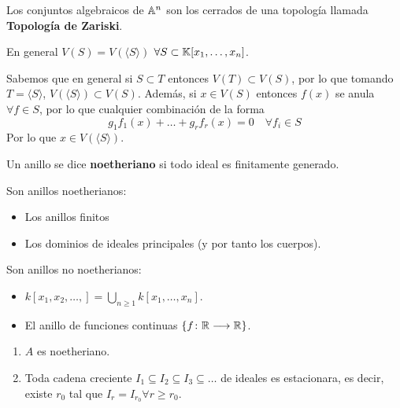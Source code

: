 \documentclass[ACGA.tex]{subfiles}
\begin{document}
\begin{defi}
Los conjuntos algebraicos de $\mathbb{A}^n$ son los cerrados de una topología llamada \textbf{Topología de Zariski}.
\end{defi}
\begin{prop}
En general $V(S)=V(\langle S\rangle)$ $\forall S \subset  \mathbb{K}[x_1,\dotsc,x_n]$.
\end{prop}
\begin{dem}
Sabemos que en general si $S\subset T$ entonces $V(T)\subset V(S)$, por lo que tomando $T=\langle S \rangle$, $V(\langle S\rangle)\subset V(S)$. Además, si $x\in V(S)$ entonces $f(x)$ se anula $\forall f \in S$, por lo que cualquier combinación de la forma
\[
g_1 f_1(x)+ \dotsc + g_rf_r(x) = 0 \quad \forall f_i \in S
\]
Por lo que $x\in V(\langle S\rangle)$.
\end{dem}
\begin{defi}
Un anillo se dice \textbf{noetheriano} si todo ideal es finitamente generado.
\end{defi}
\begin{prop}
Son anillos noetherianos:
\begin{itemize}
\item Los anillos finitos
\item Los dominios de ideales principales (y por tanto los cuerpos).
\end{itemize}
\end{prop}
\begin{nota}
Son anillos no noetherianos:
\begin{itemize}
	\item $k[x_1,x_2,\dots,] = \bigcup_{n \geq 1} k[x_1,\dots,x_n]$.
	\item El anillo de funciones continuas $\{f \colon{\mathbb{R}}\longrightarrow{\mathbb{R}}\}$.
\end{itemize}
\end{nota}
\begin{prop}\mbox{}
\begin{enumerate}
	\item $A$ es noetheriano.
	\item Toda cadena creciente $I_1 \subseteq I_2 \subseteq I_3 \subseteq \dots$ de ideales es estacionara, es decir, existe $r_0$ tal que $I_r = I_{r_0} \forall r \geq r_0$.
\end{enumerate}
\end{prop}
\end{document}
